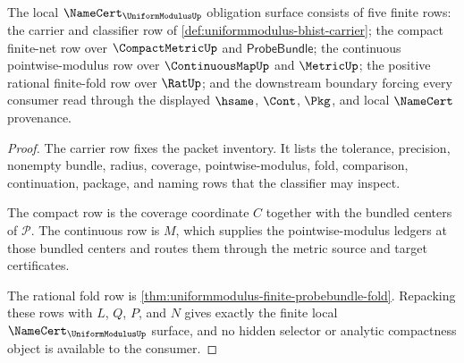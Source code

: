 \begin{theorem}
\label{thm:uniformmodulus-namecert-obligation-surface}
The local $\NameCert_{\UniformModulusUp}$ obligation surface consists of five finite rows: the carrier and classifier row of \autoref{def:uniformmodulus-bhist-carrier}; the compact finite-net row over $\CompactMetricUp$ and $\mathsf{ProbeBundle}$; the continuous pointwise-modulus row over $\ContinuousMapUp$ and $\MetricUp$; the positive rational finite-fold row over $\RatUp$; and the downstream boundary forcing every consumer read through the displayed $\hsame$, $\Cont$, $\Pkg$, and local $\NameCert$ provenance.
\end{theorem}
\begin{proof}
The carrier row fixes the packet inventory. It lists the tolerance, precision, nonempty bundle, radius, coverage, pointwise-modulus, fold, comparison, continuation, package, and naming rows that the classifier may inspect.

The compact row is the coverage coordinate $C$ together with the bundled centers of $\mathcal{P}$. The continuous row is $M$, which supplies the pointwise-modulus ledgers at those bundled centers and routes them through the metric source and target certificates.

The rational fold row is \autoref{thm:uniformmodulus-finite-probebundle-fold}. Repacking these rows with $L$, $Q$, $P$, and $N$ gives exactly the finite local $\NameCert_{\UniformModulusUp}$ surface, and no hidden selector or analytic compactness object is available to the consumer.
\end{proof}

